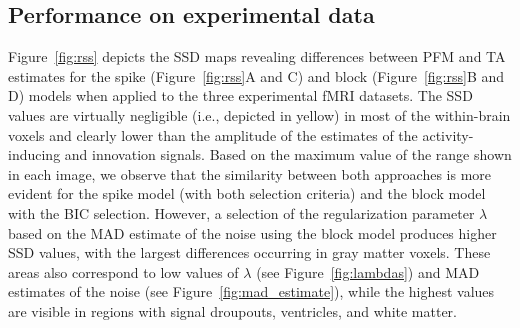
\subsection{Performance on experimental data}

Figure~\ref{fig:rss} depicts the SSD maps revealing differences between PFM and TA estimates for the spike (Figure~\ref{fig:rss}A and C) and block (Figure~\ref{fig:rss}B and D) models when applied to the three experimental fMRI datasets. The SSD values are virtually negligible (i.e., depicted in yellow) in most of the within-brain voxels and clearly lower than the amplitude of the estimates of the activity-inducing and innovation signals. Based on the maximum value of the range shown in each image, we observe that the similarity between both approaches is more evident for the spike model (with both selection criteria) and the block model with the BIC selection. However, a selection of the regularization parameter $\lambda$ based on the MAD estimate of the noise using the block model produces higher SSD values, with the largest differences occurring in gray matter voxels. These areas also correspond to low values of $\lambda$ (see Figure~\ref{fig:lambdas}) and MAD estimates of the noise (see Figure~\ref{fig:mad_estimate}), while the highest values are visible in regions with signal droupouts, ventricles, and white matter.

